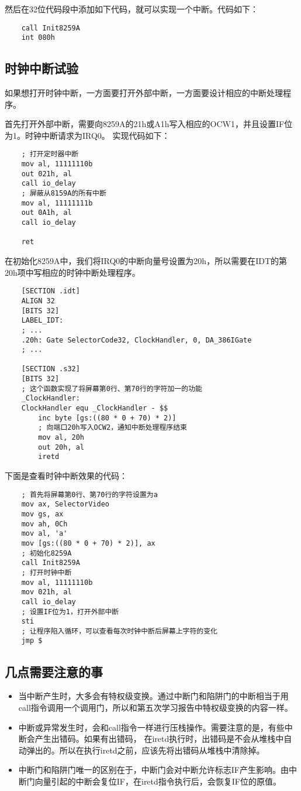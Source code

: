 \documentclass[a4paper,left=2.5cm,right=2.5cm,11pt]{article}
\begin{document}
	然后在32位代码段中添加如下代码，就可以实现一个中断。代码如下：
	\begin{lstlisting}
	call Init8259A
	int 080h
	\end{lstlisting}

\subsection{时钟中断试验}
	如果想打开时钟中断，一方面要打开外部中断，一方面要设计相应的中断处理程序。\par
	首先打开外部中断，需要向8259A的21h或A1h写入相应的OCW1，并且设置IF位为1。时钟中断请求为IRQ0。
	实现代码如下：
	\begin{lstlisting}
	; 打开定时器中断
	mov al, 11111110b
	out 021h, al
	call io_delay
	; 屏蔽从8159A的所有中断
	mov al, 11111111b
	out 0A1h, al
	call io_delay

	ret
	\end{lstlisting}

	在初始化8259A中，我们将IRQ0的中断向量号设置为20h，所以需要在IDT的第20h项中写相应的时钟中断处理程序。
	\begin{lstlisting}
	[SECTION .idt]
	ALIGN 32
	[BITS 32]
	LABEL_IDT:
	; ...
	.20h: Gate SelectorCode32, ClockHandler, 0, DA_386IGate
	; ...

	[SECTION .s32]
	[BITS 32]
	; 这个函数实现了将屏幕第0行、第70行的字符加一的功能
	_ClockHandler:
	ClockHandler equ _ClockHandler - $$
		inc byte [gs:((80 * 0 + 70) * 2)]
		; 向端口20h写入OCW2，通知中断处理程序结束
		mov al, 20h
		out 20h, al
		iretd
	\end{lstlisting}

	下面是查看时钟中断效果的代码：
	\begin{lstlisting}
	; 首先将屏幕第0行、第70行的字符设置为a
	mov ax, SelectorVideo
	mov gs, ax
	mov ah, 0Ch
	mov al, 'a'
	mov [gs:((80 * 0 + 70) * 2)], ax
	; 初始化8259A
	call Init8259A
	; 打开时钟中断
	mov al, 11111110b
	mov 021h, al
	call io_delay
	; 设置IF位为1，打开外部中断
	sti
	; 让程序陷入循环，可以查看每次时钟中断后屏幕上字符的变化
	jmp $
	\end{lstlisting}

\subsection{几点需要注意的事}
	\begin{itemize}
		\item 当中断产生时，大多会有特权级变换。通过中断门和陷阱门的中断相当于用call指令调用一个调用门，所以和第五次学习报告中特权级变换的内容一样。
		\item 中断或异常发生时，会和call指令一样进行压栈操作。需要注意的是，有些中断会产生出错码。如果有出错码，
		在iretd执行时，出错码是不会从堆栈中自动弹出的。所以在执行iretd之前，应该先将出错码从堆栈中清除掉。
		\item 中断门和陷阱门唯一的区别在于，中断门会对中断允许标志IF产生影响。由中断门向量引起的中断会复位IF，在iretd指令执行后，会恢复IF位的原值。
	\end{itemize}
\end{document}
